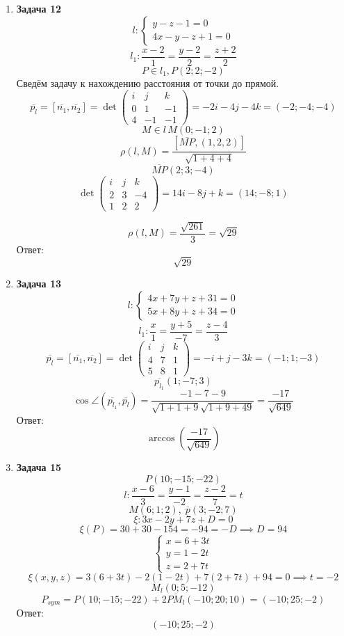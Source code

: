 \documentclass{article}
\theoremstyle{plain}
\begin{document}
\begin{enumerate}
\item \textbf{Задача 12}
\begin{equation}
l:
    \begin{cases}
    y - z - 1 = 0\\
    4x - y - z + 1 = 0
    \end{cases}
\end{equation}
$$ l_1 : \frac{x - 2}{1} = \frac{y - 2}{2} = \frac{z + 2}{2} $$
$$P \in l_1, P(2; 2; -2)$$
Сведём задачу к нахождению расстояния от точки до прямой.
$$\overline{p_l} = [\overline{n_1}, \overline{n_2}] = \det\begin{pmatrix}
    i & j & k \\
    0 & 1 & -1 \\
    4 & -1 & -1 
\end{pmatrix} = -2i - 4j -4k = (-2; -4; -4)$$
$$M \in l\, M(0; -1; 2)$$
$$\rho(l, M) = \frac{[\overline{MP}, (1, 2, 2)]}{\sqrt{1 + 4 + 4}}$$
$$\overline{MP}(2; 3; -4) $$
$$ \det \begin{pmatrix} 
    i & j & k \\
    2 & 3 & -4 \\
    1 & 2 & 2 
\end{pmatrix}  = 14i - 8j + k = (14; -8; 1)$$

$$\rho(l, M) = \frac{\sqrt{261}}{3} = \sqrt{29} $$
Ответ:
$$\sqrt{29}$$
\item \textbf{Задача 13}
\begin{equation}
l:
    \begin{cases}
    4x + 7y + z + 31 = 0\\
    5x + 8y + z + 34 = 0
    \end{cases} 
\end{equation}
$$l_1 : \frac{x}{1} = \frac{y + 5}{-7} = \frac{z - 4}{3}$$
$$\overline{p_l} = [\overline{n_1}, \overline{n_2}] = \det\begin{pmatrix}i & j & k \\ 4 & 7 & 1 \\ 5 & 8 & 1\end{pmatrix} = -i + j -3k = (-1; 1; -3)$$
$$\overline{p_{l_1}} (1; -7; 3)$$
$$\cos{\angle{(\overline{p_{l_1}}, \overline{p_l})}} = \frac{-1 - 7 - 9}{\sqrt{1 + 1 + 9}\sqrt{1 + 9 + 49}} = \frac{-17}{\sqrt{649}}$$
Ответ:
$$\arccos{(\frac{-17}{\sqrt{649}})}$$
\item \textbf{Задача 15}
$$P(10; -15; -22)$$
$$l: \frac{x - 6}{3} = \frac{y - 1}{-2} = \frac{z - 2}{7} = t $$
$$M(6; 1; 2),\;\overline{p}(3; -2; 7)$$
$$\xi: 3x - 2y + 7z + D = 0$$
$$\xi(P) = 30 + 30 - 154 = -94 = -D \implies D = 94 $$
\begin{equation}
\begin{cases}
x = 6 + 3t\\
y = 1 - 2t \\
z = 2 + 7t
\end{cases}
\end{equation}
$$\xi(x, y, z) = 3 (6 + 3t) - 2(1 - 2t) + 7(2 + 7t) + 94 = 0 \implies t = -2 $$ 
$$M_l(0; 5; -12)$$
$$ P_{sym} = P(10; -15; -22) + 2\overline{PM_l}(-10; 20; 10) = (-10; 25; -2)$$
Ответ:
$$(-10; 25; -2)$$


\end{enumerate}
\end{document}
